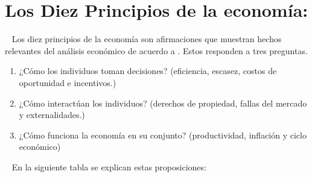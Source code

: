 \documentclass[
  letterpaper,
  DIV=11,
  numbers=noendperiod]{scrreport}
\providecommand{\tightlist}{%
  \setlength{\itemsep}{0pt}\setlength{\parskip}{0pt}}\usepackage{longtable,booktabs,array}
\begin{document}
\hypertarget{los-diez-principios-de-la-economuxeda}{%
\section{Los Diez Principios de la
economía:}\label{los-diez-principios-de-la-economuxeda}}

~ Los diez principios de la economía son afirmaciones que muestran
hechos relevantes del análisis económico de acuerdo a
\cite{mankiw_principios_2012}. Estos responden a tres preguntas.

\begin{enumerate}
\def\labelenumi{\arabic{enumi}.}
\tightlist
\item
  ¿Cómo los individuos toman decisiones? (eficiencia, escasez, costos de
  oportunidad e incentivos.)
\item
  ¿Cómo interactúan los individuos? (derechos de propiedad, fallas del
  mercado y externalidades.)
\item
  ¿Cómo funciona la economía en su conjunto? (productividad, inflación y
  ciclo económico)
\end{enumerate}

~ En la siguiente tabla se explican estas proposiciones:
\end{document}
